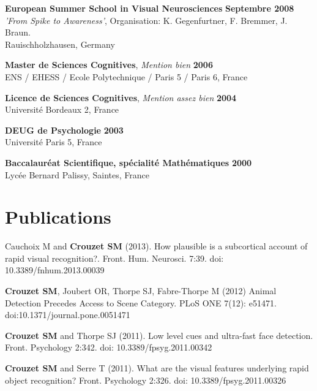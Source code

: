 \documentclass[margin,line]{resume}
\begin{document}
\begin{resume}
	\textbf{European Summer School in Visual Neurosciences} \hfill \textbf{Septembre 2008}\\
	\textsl{'From Spike to Awareness'}, Organisation: K. Gegenfurtner, F. Bremmer, J. Braun.\\
	Rauischholzhausen, Germany
	\vspace{-1.5mm}
	
	\textbf{Master de Sciences Cognitives}, \textsl{Mention bien} \hfill \textbf{2006}\\
	ENS / EHESS / Ecole Polytechnique / Paris 5 / Paris 6, France
	\vspace{-1.5mm}
	
	\textbf{Licence de Sciences Cognitives}, \textsl{Mention assez bien} \hfill \textbf{2004}\\
	Université Bordeaux 2, France
	
	\textbf{DEUG de Psychologie} \hfill \textbf{2003}\\
	Université Paris 5, France
	\vspace{-1.5mm}
	
	\textbf{Baccalauréat Scientifique, spécialité Mathématiques} \hfill \textbf{2000}\\
	Lycée Bernard Palissy, Saintes, France



\vspace{3mm}	
\section{\mysidestyle Publications}

	Cauchoix M and \textbf{Crouzet SM} (2013). How plausible is a subcortical account of rapid visual recognition?. Front. Hum. Neurosci. 7:39. doi: 10.3389/fnhum.2013.00039
	
	\vspace{-2mm} \textbf{Crouzet SM}, Joubert OR, Thorpe SJ, Fabre-Thorpe M (2012) Animal Detection Precedes Access to Scene Category. PLoS ONE 7(12): e51471. doi:10.1371/journal.pone.0051471

	\vspace{-2mm} \textbf{Crouzet SM} and Thorpe SJ (2011). Low level cues and ultra-fast face detection. Front. Psychology 2:342. doi: 10.3389/fpsyg.2011.00342

	\vspace{-2mm} \textbf{Crouzet SM} and Serre T (2011). What are the visual features underlying rapid object recognition? Front. Psychology 2:326. doi: 10.3389/fpsyg.2011.00326


\end{resume}
\end{document}
